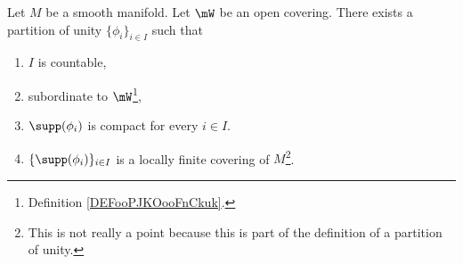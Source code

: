 \begin{theorem}			\label{THOooEJDHooTkRvsn}
	Let \( M\) be a smooth manifold. Let \( \mW\) be an open covering. There exists a partition of unity \( \{ \phi_i \}_{i\in I}\) such that
	\begin{enumerate}
		\item
		      \( I\) is countable,
		\item
		      subordinate to \( \mW\)\footnote{Definition \ref{DEFooPJKOooFnCkuk}.},
		\item
		      \( \supp(\phi_i)\) is compact for every \( i\in I\).
		\item
		      \( \{ \supp(\phi_i) \}_{i\in I}\) is a locally finite covering of \( M\)\footnote{This is not really a point because this is part of the definition of a partition of unity.}.
	\end{enumerate}
\end{theorem}

